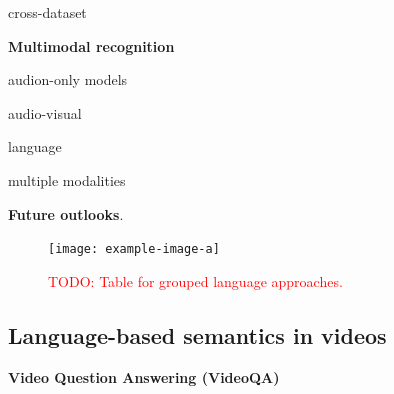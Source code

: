 \documentclass[smallextended,twocolumn,natbib]{svjour3}
\begin{document}
cross-dataset
\citep{perrett2019ddlstm}
\citep{kapidis2019multitask} 
\citep{bansal2024videocon}

\noindent
\textbf{Multimodal recognition} 

audion-only models 
\citep{baade2022mae,gong2021psla,kazakos2021slow,kong2020panns,koutini2021efficient,stergiou2023play}

audio-visual 
\citep{arandjelovic2018objects}
\citep{zhao2018sound}
\citep{gong2022uavm}
\citep{singh2024looking}
\citep{gong2023contrastive}
\citep{huang2023mavil}
\citep{pian2023audio}
\citep{guo2024crossmae}
\citep{georgescu2023audiovisual}
\citep{lin2024siamese}
\citep{nagrani2021attention}
\citep{fayek2020large}
\citep{wang2020makes}
\citep{jaegle2021perceiver}
\citep{xiao2020audiovisual}
\citep{srivastava2024omnivec2}

language 
\citep{xu2021videoclip}
\citep{ashutosh2023hiervl}
\citep{kahatapitiya2024victr}
\citep{li2023videochat}
\citep{jiang2023motiongpt}
\citep{bain2021frozen}
\citep{fu2021violet}
\citep{han2022temporal}
\citep{ko2022video}
\citep{lei2021less}
\citep{li2022align}
\citep{li2020hero}
\citep{miech2020end}
\citep{seo2022end}
\citep{seo2021look}
\citep{sun2019videobert}
\citep{wang2023all}
\citep{wang2022object}
\citep{zellers2021merlot}
\citep{lei2021detecting}
\citep{lin2022egocentric}
\citep{wang2022contrastive}
\citep{zhu2020actbert}

multiple modalities
\citep{akbari2021vatt}
\citep{kaiser2017one}
\citep{radevski2023multimodal} 
\citep{srivastava2024omnivec}
\citep{zhang2024multimodal}
\citep{munro2020multi}
\citep{recasens2023zorro}
\citep{dai2022one}
\citep{zellers2022merlot}


\noindent
\textbf{Future outlooks}.


\begin{figure}[t]
    \centering
    \texttt{[image: example-image-a]}
    \caption{\textcolor{red}{TODO: Table for grouped language approaches.}}
\end{figure}


\subsection{Language-based semantics in videos}
\citep{song2024moviechat}
\citep{yu2017end}
\citep{anderson2018vision}

\noindent
\textbf{Video Question Answering (VideoQA)}
\citep{xue2023egocentric} 
\citep{min2024morevqa}
\citep{yang2022zero}
\citep{yang2021just}
\citep{yang2022learning}
\citep{xiao2021next}
\citep{xu2017video}
\citep{zhang2023video}
\citep{yu2023self}
\citep{xiao2024can}
\citep{gao2023mist}
\citep{xiao2022video}
\citep{xiao2023contrastive}
\citep{li2022equivariant}
\citep{li2023discovering}
\citep{jiang2020reasoning}
\citep{park2021bridge}
\citep{guo2021multi}
\citep{jang2017tgif}
\citep{fan2019heterogeneous}
\citep{gao2018motion}
\citep{huang2020location}
\citep{li2019beyond}
\citep{liu2021hair}
\citep{dang2021hierarchical}
\citep{cherian20222}
\citep{geng2021dynamic}
\citep{ye2017video}
\citep{zeng2017leveraging}
\end{document}
